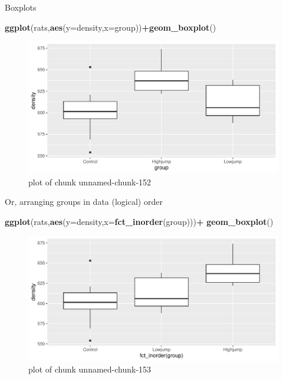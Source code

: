 \documentclass[ignorenonframetext,]{beamer}
\newenvironment{Shaded}{\begin{snugshade}}{\end{snugshade}}
\newcommand{\DataTypeTok}[1]{\textcolor[rgb]{0.13,0.29,0.53}{#1}}
\newcommand{\KeywordTok}[1]{\textcolor[rgb]{0.13,0.29,0.53}{\textbf{#1}}}
\newcommand{\NormalTok}[1]{#1}
\newcommand{\OperatorTok}[1]{\textcolor[rgb]{0.81,0.36,0.00}{\textbf{#1}}}
\begin{document}
\begin{frame}[fragile]{Boxplots}
\protect\hypertarget{boxplots-1}{}

\begin{Shaded}
\begin{Highlighting}[]
\KeywordTok{ggplot}\NormalTok{(rats,}\KeywordTok{aes}\NormalTok{(}\DataTypeTok{y=}\NormalTok{density,}\DataTypeTok{x=}\NormalTok{group))}\OperatorTok{+}\KeywordTok{geom_boxplot}\NormalTok{()}
\end{Highlighting}
\end{Shaded}

\begin{figure}
\centering
\includegraphics{figure/unnamed-chunk-152-1.pdf}
\caption{plot of chunk unnamed-chunk-152}
\end{figure}

\end{frame}

\begin{frame}[fragile]{Or, arranging groups in data (logical) order}
\protect\hypertarget{or-arranging-groups-in-data-logical-order}{}

\begin{Shaded}
\begin{Highlighting}[]
\KeywordTok{ggplot}\NormalTok{(rats,}\KeywordTok{aes}\NormalTok{(}\DataTypeTok{y=}\NormalTok{density,}\DataTypeTok{x=}\KeywordTok{fct_inorder}\NormalTok{(group)))}\OperatorTok{+}
\KeywordTok{geom_boxplot}\NormalTok{()}
\end{Highlighting}
\end{Shaded}

\begin{figure}
\centering
\includegraphics{figure/unnamed-chunk-153-1.pdf}
\caption{plot of chunk unnamed-chunk-153}
\end{figure}

\end{frame}
\end{document}
